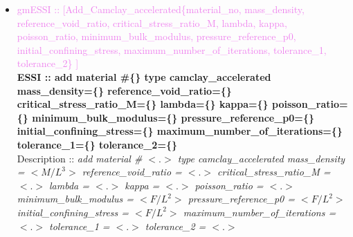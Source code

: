 \documentclass[11pt]{article}
\begin{document}
\begin{itemize}
      \item \textcolor{violet}{gmESSI :: [Add\_Camclay\_accelerated\{material\_no, mass\_density, reference\_void\_ratio, critical\_stress\_ratio\_M, lambda, kappa, poisson\_ratio, minimum\_bulk\_modulus, pressure\_reference\_p0, initial\_confining\_stress, maximum\_number\_of\_iterations, tolerance\_1, tolerance\_2\} ]}\\
      \textbf{ESSI :: add material \#\{\} type camclay\_accelerated mass\_density=\{\} reference\_void\_ratio=\{\} critical\_stress\_ratio\_M=\{\} lambda=\{\} kappa=\{\} poisson\_ratio=\{\} minimum\_bulk\_modulus=\{\} pressure\_reference\_p0=\{\} initial\_confining\_stress=\{\}  maximum\_number\_of\_iterations=\{\} tolerance\_1=\{\} tolerance\_2=\{\} }\\
      Description ::  \textit{ add material \# $<.>$ type camclay\_accelerated mass\_density = $<M/L^3>$ reference\_void\_ratio = $<.>$ critical\_stress\_ratio\_M = $<.>$ lambda = $<.>$ kappa = $<.>$ poisson\_ratio = $<.>$ minimum\_bulk\_modulus = $<F/L^2>$ pressure\_reference\_p0 = $<F/L^2>$ initial\_confining\_stress = $<F/L^2>$  maximum\_number\_of\_iterations = $<.>$ tolerance\_1 = $<.>$ tolerance\_2 = $<.>$} 


\end{itemize}
\end{document}
